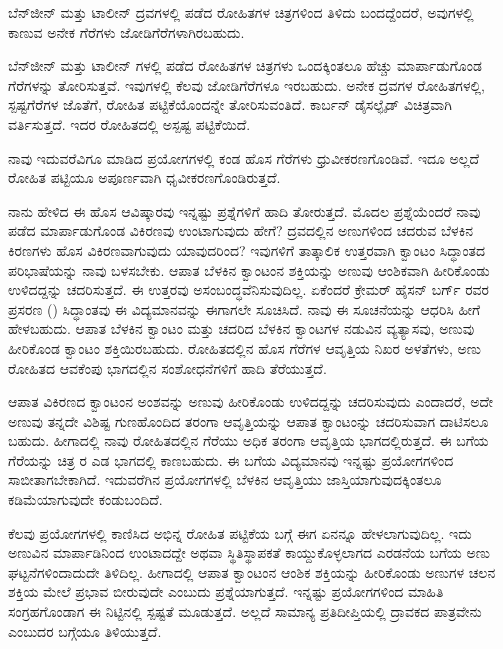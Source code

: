 ಬೆನ್‍ಜೀನ್ ಮತ್ತು ಟಾಲೀನ್ ದ್ರವಗಳಲ್ಲಿ ಪಡೆದ ರೋಹಿತಗಳ ಚಿತ್ರಗಳಿಂದ ತಿಳಿದು ಬಂದ\-ದ್ದೆಂದರೆ, ಅವುಗಳಲ್ಲಿ ಕಾಣುವ ಅನೇಕ ಗೆರೆಗಳು ಜೋಡಿಗೆರೆಗಳಾಗಿರಬಹುದು.

ಬೆನ್‍ಜೀನ್ ಮತ್ತು ಟಾಲೀನ್ ಗಳಲ್ಲಿ ಪಡೆದ ರೋಹಿತಗಳ ಚಿತ್ರಗಳು ಒಂದಕ್ಕಿಂತಲೂ ಹೆಚ್ಚು ಮಾರ್ಪಾಡುಗೊಂಡ ಗೆರೆಗಳನ್ನು ತೋರಿಸುತ್ತವೆ. ಇವುಗಳಲ್ಲಿ ಕೆಲವು ಜೋಡಿಗೆರೆಗಳೂ ಇರಬಹುದು. ಅನೇಕ ದ್ರವಗಳ ರೋಹಿತಗಳಲ್ಲಿ, ಸ್ಪಷ್ಟಗೆರೆಗಳ ಜೊತೆಗೆ, ರೋಹಿತ ಪಟ್ಟಿಕೆಯೊಂದನ್ನೇ ತೋರಿಸು\-ವಂತಿದೆ. ಕಾರ್ಬನ್ ಡೈಸಲ್ಫೈಡ್ ವಿಚಿತ್ರವಾಗಿ ವರ್ತಿಸುತ್ತದೆ. ಇದರ ರೋಹಿತದಲ್ಲಿ ಅಸ್ಪಷ್ಟ ಪಟ್ಟಿಕೆಯಿದೆ.

ನಾವು ಇದುವರೆವಿಗೂ ಮಾಡಿದ ಪ್ರಯೋಗಗಳಲ್ಲಿ ಕಂಡ ಹೊಸ ಗೆರೆಗಳು ಧ್ರುವೀಕರಣಗೊಂಡಿವೆ. ಇದೂ ಅಲ್ಲದೆ ರೋಹಿತ ಪಟ್ಟಿಯೂ ಅಪೂರ್ಣವಾಗಿ ಧೃವೀಕರಣಗೊಂಡಿರುತ್ತದೆ.



ನಾನು ಹೇಳಿದ ಈ ಹೊಸ ಆವಿಷ್ಕಾರವು ಇನ್ನಷ್ಟು ಪ್ರಶ್ನೆಗಳಿಗೆ ಹಾದಿ ತೋರುತ್ತದೆ. ಮೊದಲ ಪ್ರಶ್ನೆಯೆಂದರೆ ನಾವು ಪಡೆದ ಮಾರ್ಪಾಡುಗೊಂಡ ವಿಕಿರಣವು ಉಂಟಾಗುವುದು ಹೇಗೆ? ದ್ರವದಲ್ಲಿನ ಅಣುಗಳಿಂದ ಚದರುವ ಬೆಳಕಿನ ಕಿರಣಗಳು ಹೊಸ ವಿಕಿರಣವಾಗುವುದು ಯಾವುದರಿಂದ? ಇವುಗಳಿಗೆ ತಾತ್ಕಾಲಿಕ ಉತ್ತರವಾಗಿ ಕ್ವಾಂಟಂ ಸಿದ್ಧಾಂತದ ಪರಿಭಾಷೆಯನ್ನು ನಾವು ಬಳಸಬೇಕು. ಆಪಾತ ಬೆಳಕಿನ ಕ್ವಾಂಟಂನ ಶಕ್ತಿಯನ್ನು ಅಣುವು ಆಂಶಿಕವಾಗಿ ಹೀರಿಕೊಂಡು ಉಳಿದದ್ದನ್ನು ಚದರಿಸುತ್ತದೆ. ಈ ಉತ್ತರವು ಅಸಂಬಂದ್ಧವೆನಿಸುವುದಿಲ್ಲ. ಏಕೆಂದರೆ ಕ್ರೇಮರ್\enginline{--} ಹೈಸನ್ ಬರ್ಗ್ ರವರ ಪ್ರಸರಣ () ಸಿದ್ಧಾಂತವು ಈ ವಿದ್ಯಮಾನವನ್ನು ಈಗಾಗಲೇ ಸೂಚಿಸಿದೆ. ನಾವು ಈ ಸೂಚನೆಯನ್ನು ಆಧರಿಸಿ ಹೀಗೆ ಹೇಳಬಹುದು. ಆಪಾತ ಬೆಳಕಿನ ಕ್ವಾಂಟಂ ಮತ್ತು ಚದರಿದ ಬೆಳಕಿನ ಕ್ವಾಂಟಗಳ ನಡುವಿನ ವ್ಯತ್ಯಾಸವು, ಅಣುವು ಹೀರಿಕೊಂಡ ಕ್ವಾಂಟಂ ಶಕ್ತಿಯಿರಬಹುದು. ರೋಹಿತದಲ್ಲಿನ ಹೊಸ ಗೆರೆಗಳ ಆವೃತ್ತಿಯ ನಿಖರ ಅಳತೆಗಳು, ಅಣು ರೋಹಿತದ ಆವಕೆಂಪು ಭಾಗದಲ್ಲಿನ ಸಂಶೋಧನೆಗಳಿಗೆ ಹಾದಿ ತೆರೆಯುತ್ತದೆ.

ಆಪಾತ ವಿಕಿರಣದ ಕ್ವಾಂಟಂನ ಅಂಶವನ್ನು ಅಣುವು ಹೀರಿಕೊಂಡು ಉಳಿದದ್ದನ್ನು ಚದರಿಸುವುದು ಎಂದಾದರೆ, ಅದೇ ಅಣುವು ತನ್ನದೇ ವಿಶಿಷ್ಟ ಗುಣಹೊಂದಿದ ತರಂಗಾ ಆವೃತ್ತಿಯನ್ನು ಆಪಾತ ಕ್ವಾಂಟಂನ್ನು ಚದರಿಸುವಾಗ ದಾಟಿಸಲೂ ಬಹುದು. ಹೀಗಾದಲ್ಲಿ ನಾವು ರೋಹಿತದಲ್ಲಿನ ಗೆರೆಯು ಅಧಿಕ ತರಂಗಾ ಆವೃತ್ತಿಯ ಭಾಗದಲ್ಲಿರುತ್ತದೆ. ಈ ಬಗೆಯ ಗೆರೆಯನ್ನು ಚಿತ್ರ  ರ ಎಡ ಭಾಗದಲ್ಲಿ ಕಾಣಬಹುದು. ಈ ಬಗೆಯ ವಿದ್ಯಮಾನವು ಇನ್ನಷ್ಟು ಪ್ರಯೋಗಗಳಿಂದ ಸಾಬೀತಾಗಬೇಕಾಗಿದೆ. ಇದುವರೆಗಿನ ಪ್ರಯೋಗಗಳಲ್ಲಿ ಬೆಳಕಿನ ಆವೃತ್ತಿಯು ಜಾಸ್ತಿಯಾಗು\-ವುದಕ್ಕಿಂತಲೂ ಕಡಿಮೆಯಾಗುವುದೇ ಕಂಡುಬಂದಿದೆ.

ಕೆಲವು ಪ್ರಯೋಗಗಳಲ್ಲಿ ಕಾಣಿಸಿದ ಅಭಿನ್ನ ರೋಹಿತ ಪಟ್ಟಿಕೆಯ ಬಗ್ಗೆ ಈಗ ಏನನ್ನೂ ಹೇಳಲಾಗುವು\-ದಿಲ್ಲ. ಇದು ಅಣುವಿನ ಮಾರ್ಪಾಡಿನಿಂದ ಉಂಟಾದದ್ದೇ ಅಥವಾ ಸ್ಥಿತಿಸ್ಥಾಪಕತೆ ಕಾಯ್ದುಕೊಳ್ಳಲಾಗದ ಎರಡನೆಯ ಬಗೆಯ ಅಣು ಘಟ್ಟನೆಗಳಿಂದಾದುದೇ ತಿಳಿದಿಲ್ಲ. ಹೀಗಾದಲ್ಲಿ ಆಪಾತ ಕ್ವಾಂಟಂನ ಆಂಶಿಕ ಶಕ್ತಿಯನ್ನು ಹೀರಿಕೊಂಡು ಅಣುಗಳ ಚಲನ ಶಕ್ತಿಯ ಮೇಲೆ ಪ್ರಭಾವ ಬೀರುವುದೇ ಎಂಬುದು ಪ್ರಶ್ನೆಯಾಗುತ್ತದೆ. ಇನ್ನಷ್ಟು ಪ್ರಯೋಗಗಳಿಂದ ಮಾಹಿತಿ ಸಂಗ್ರಹಗೊಂಡಾಗ ಈ ನಿಟ್ಟಿನಲ್ಲಿ ಸ್ಪಷ್ಟತೆ ಮೂಡುತ್ತದೆ. ಅಲ್ಲದೆ ಸಾಮಾನ್ಯ ಪ್ರತಿದೀಪ್ತಿಯಲ್ಲಿ ದ್ರಾವಕದ ಪಾತ್ರವೇನು ಎಂಬುದರ ಬಗ್ಗೆಯೂ ತಿಳಿಯುತ್ತದೆ.



